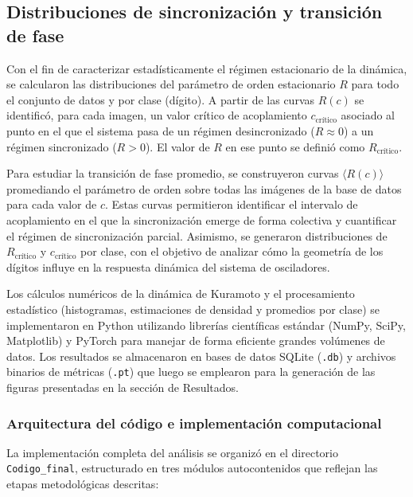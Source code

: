 \documentclass[12pt]{article}
\begin{document}
\subsection{Distribuciones de sincronización y transición de fase}

Con el fin de caracterizar estadísticamente el régimen estacionario de la dinámica, se calcularon las distribuciones del parámetro de orden estacionario \(R\) para todo el conjunto de datos y por clase (dígito). A partir de las curvas \(R(c)\) se identificó, para cada imagen, un valor crítico de acoplamiento \(c_{\text{crítico}}\) asociado al punto en el que el sistema pasa de un régimen desincronizado (\(R \approx 0\)) a un régimen sincronizado (\(R > 0\)). El valor de \(R\) en ese punto se definió como \(R_{\text{crítico}}\).

Para estudiar la transición de fase promedio, se construyeron curvas \(\langle R(c) \rangle\) promediando el parámetro de orden sobre todas las imágenes de la base de datos para cada valor de \(c\). Estas curvas permitieron identificar el intervalo de acoplamiento en el que la sincronización emerge de forma colectiva y cuantificar el régimen de sincronización parcial. Asimismo, se generaron distribuciones de \(R_{\text{crítico}}\) y \(c_{\text{crítico}}\) por clase, con el objetivo de analizar cómo la geometría de los dígitos influye en la respuesta dinámica del sistema de osciladores.

Los cálculos numéricos de la dinámica de Kuramoto y el procesamiento estadístico (histogramas, estimaciones de densidad y promedios por clase) se implementaron en Python utilizando librerías científicas estándar (NumPy, SciPy, Matplotlib) y PyTorch para manejar de forma eficiente grandes volúmenes de datos. Los resultados se almacenaron en bases de datos SQLite (\texttt{.db}) y archivos binarios de métricas (\texttt{.pt}) que luego se emplearon para la generación de las figuras presentadas en la sección de Resultados.

\subsubsection{Arquitectura del código e implementación computacional}

La implementación completa del análisis se organizó en el directorio \texttt{Codigo\_final}, estructurado en tres módulos autocontenidos que reflejan las etapas metodológicas descritas:
\end{document}
